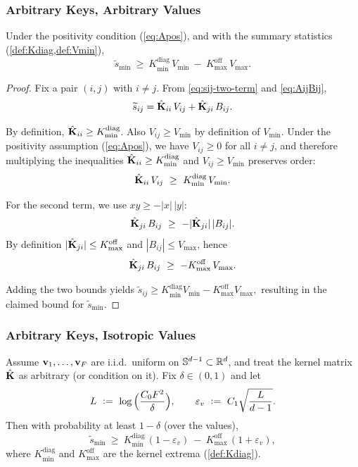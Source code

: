 \subsubsection{Arbitrary Keys, Arbitrary Values}
\label{app:signal-det-arb-arb}

\begin{theorem}
Under the positivity condition (\eqref{eq:Apos}), and with the summary statistics (\cref{def:Kdiag,def:Vmin}),
\[
\widetilde{s}_{\min}\ \ge\ K_{\min}^{\mathrm{diag}}\,V_{\min}\ -\ K_{\max}^{\mathrm{off}}\,V_{\max}.
\]
\end{theorem}

\begin{proof}
Fix a pair $(i,j)$ with $i\neq j$.
From \eqref{eq:sij-two-term} and \eqref{eq:AijBij},
\[
\widetilde{s}_{ij}=\hat{\mathbf{K}}_{ii}\,V_{ij}+\hat{\mathbf{K}}_{ji}\,B_{ij}.
\]

By definition, $\hat{\mathbf{K}}_{ii}\ge K_{\min}^{\mathrm{diag}}$.
Also $V_{ij}\ge V_{\min}$ by definition of $V_{\min}$.
Under the positivity assumption (\eqref{eq:Apos}), we have $V_{ij}\ge 0$ for all $i\neq j$, and therefore
multiplying the inequalities $\hat{\mathbf{K}}_{ii}\ge K_{\min}^{\mathrm{diag}}$ and $V_{ij}\ge V_{\min}$ preserves order:
\[
\hat{\matK}_{ii}\,V_{ij}\ \ge\ K_{\min}^{\mathrm{diag}}\,V_{\min}.
\]

For the second term, we use $xy\ge -|x|\,|y|$:
\[
\hat{\matK}_{ji}\,B_{ij}\ \ge\ -|\hat{\matK}_{ji}|\,|B_{ij}|.
\]
By definition $|\hat{\mathbf{K}}_{ji}|\le K_{\max}^{\mathrm{off}}$ and $|B_{ij}|\le V_{\max}$, hence
\[
\hat{\matK}_{ji}\,B_{ij}\ \ge\ -K_{\max}^{\mathrm{off}}\,V_{\max}.
\]

Adding the two bounds yields
\(
\widetilde{s}_{ij}\ge K_{\min}^{\mathrm{diag}}V_{\min}-K_{\max}^{\mathrm{off}}V_{\max},
\)
resulting in the claimed bound for $\widetilde{s}_{\min}$.
\end{proof}


\subsubsection{Arbitrary Keys, Isotropic Values}
\begin{theorem}
\label{app:signal-arbkeys-isovalues}
Assume ${\mathbf{v}}_{1},\dots,{\mathbf{v}}_{F}$ are i.i.d.\ uniform on $\mathbb{S}^{d-1}\subset\mathbb{R}^d$, and treat the kernel matrix $\hat{\mathbf{K}}$ as arbitrary (or condition on it).
Fix $\delta\in(0,1)$ and let
\[
L\ \vcentcolon=\ \log\Big(\frac{C_{0} F^2}{\delta}\Big),
\qquad
\varepsilon_{v}\ \vcentcolon=\ C_{1}\sqrt{\frac{L}{d-1}}.
\]
Then with probability at least $1-\delta$ (over the values),
\[
\widetilde{s}_{\min}
\ \ge\
K_{\min}^{\mathrm{diag}}\,(1-\varepsilon_{v})
\ -\
K_{\max}^{\mathrm{off}}\,(1+\varepsilon_{v}),
\]
where $K_{\min}^{\mathrm{diag}}$ and $K_{\max}^{\mathrm{off}}$ are the kernel extrema (\cref{def:Kdiag}).
\end{theorem}

